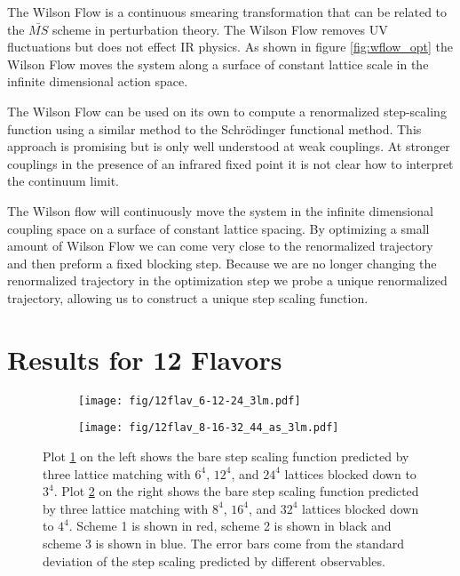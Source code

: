 \documentclass{PoS}
\begin{document}
The Wilson Flow is a continuous smearing transformation\cite{Narayanan:2006rf} that can be related to the $\bar{MS}$ scheme in perturbation theory\cite{Luscher:2010iy}.
The Wilson Flow removes UV fluctuations but does not effect IR physics.
As shown in figure \ref{fig:wflow_opt} the Wilson Flow moves the system along a surface of constant lattice scale in the infinite dimensional action space.

The Wilson Flow can be used on its own to compute a renormalized step-scaling function using a similar method to the Schrödinger functional method\cite{Fodor:2012td, Fodor:2012qh}.
This approach is promising but is only well understood at weak couplings.
At stronger couplings in the presence of an infrared fixed point it is not clear how to interpret the continuum limit.

The Wilson flow will continuously move the system in the infinite dimensional coupling space on a surface of constant lattice spacing.
By optimizing a small amount of Wilson Flow we can come very close to the renormalized trajectory and then preform a fixed blocking step.
Because we are no longer changing the renormalized trajectory in the optimization step we probe a unique renormalized trajectory, allowing us to construct a unique step scaling function.



\section{Results for 12 Flavors}
\label{sec:results}
\begin{figure}[h]
  \centering
  \begin{subfigure}[b]{0.48\textwidth}
    \texttt{[image: fig/12flav\_6-12-24\_3lm.pdf]}
    \label{fig:6-12-24_33}
  \end{subfigure}
  \begin{subfigure}[b]{0.48\textwidth}
    \texttt{[image: fig/12flav\_8-16-32\_44\_as\_3lm.pdf]}
    \label{fig:8-16-32_44}
  \end{subfigure}
  \caption{Plot \ref{fig:6-12-24_33} on the left shows the bare step scaling function predicted by three lattice matching with $6^4$, $12^4$, and $24^4$ lattices blocked down to $3^4$.  Plot \ref{fig:8-16-32_44} on the right shows the bare step scaling function predicted by three lattice matching with $8^4$, $16^4$, and $32^4$ lattices blocked down to $4^4$.  Scheme 1 is shown in red, scheme 2 is shown in black and scheme 3 is shown in blue.  The error bars come from the standard deviation of the step scaling predicted by different observables.}
\label{fig:multischeme}
\end{figure}
\end{document}
